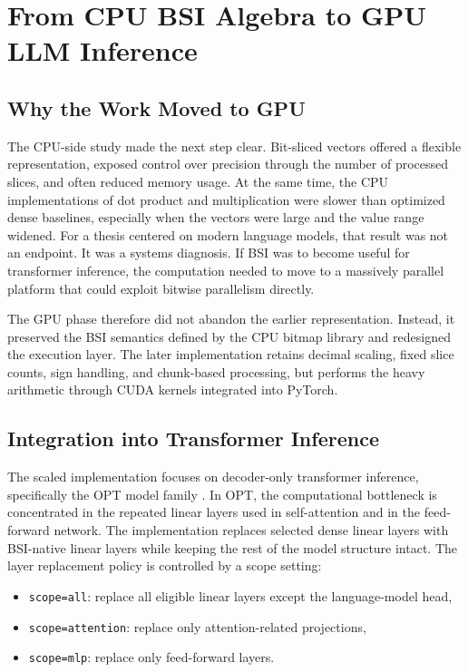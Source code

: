 \chapter{From CPU BSI Algebra to GPU LLM Inference}

\section{Why the Work Moved to GPU}
The CPU-side study made the next step clear. Bit-sliced vectors offered a flexible representation, exposed control over precision through the number of processed slices, and often reduced memory usage. At the same time, the CPU implementations of dot product and multiplication were slower than optimized dense baselines, especially when the vectors were large and the value range widened. For a thesis centered on modern language models, that result was not an endpoint. It was a systems diagnosis. If BSI was to become useful for transformer inference, the computation needed to move to a massively parallel platform that could exploit bitwise parallelism directly.

The GPU phase therefore did not abandon the earlier representation. Instead, it preserved the BSI semantics defined by the CPU bitmap library and redesigned the execution layer. The later implementation retains decimal scaling, fixed slice counts, sign handling, and chunk-based processing, but performs the heavy arithmetic through CUDA kernels integrated into PyTorch.

\section{Integration into Transformer Inference}
The scaled implementation focuses on decoder-only transformer inference, specifically the OPT model family \cite{opt}. In OPT, the computational bottleneck is concentrated in the repeated linear layers used in self-attention and in the feed-forward network. The implementation replaces selected dense linear layers with BSI-native linear layers while keeping the rest of the model structure intact. The layer replacement policy is controlled by a scope setting:

\begin{itemize}[leftmargin=2em]
\item \texttt{scope=all}: replace all eligible linear layers except the language-model head,
\item \texttt{scope=attention}: replace only attention-related projections,
\item \texttt{scope=mlp}: replace only feed-forward layers.
\end{itemize}

